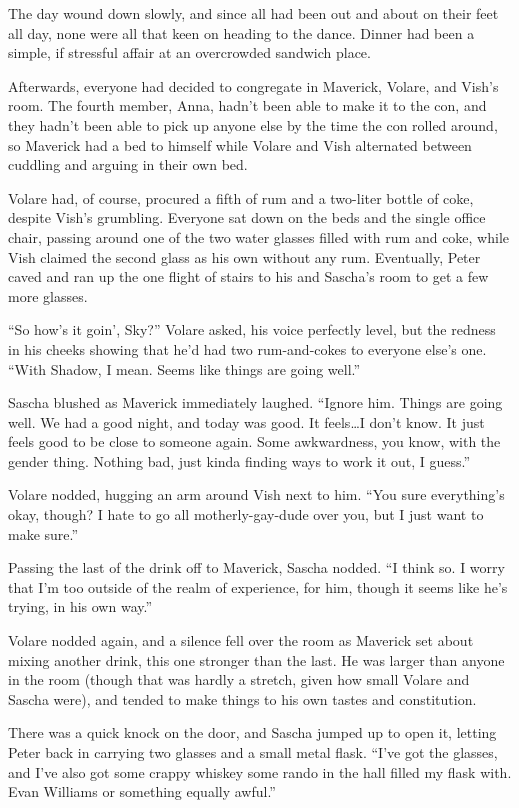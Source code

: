 \secdiv

The day wound down slowly, and since all had been out and about on their feet all day, none were all that keen on heading to the dance. Dinner had been a simple, if stressful affair at an overcrowded sandwich place.

Afterwards, everyone had decided to congregate in Maverick, Volare, and Vish's room. The fourth member, Anna, hadn't been able to make it to the con, and they hadn't been able to pick up anyone else by the time the con rolled around, so Maverick had a bed to himself while Volare and Vish alternated between cuddling and arguing in their own bed.

Volare had, of course, procured a fifth of rum and a two-liter bottle of coke, despite Vish's grumbling. Everyone sat down on the beds and the single office chair, passing around one of the two water glasses filled with rum and coke, while Vish claimed the second glass as his own without any rum. Eventually, Peter caved and ran up the one flight of stairs to his and Sascha's room to get a few more glasses.

``So how's it goin', Sky?'' Volare asked, his voice perfectly level, but the redness in his cheeks showing that he'd had two rum-and-cokes to everyone else's one. ``With Shadow, I mean. Seems like things are going well.''

Sascha blushed as Maverick immediately laughed. ``Ignore him. Things are going well. We had a good night, and today was good. It feels\ldots{}I don't know. It just feels good to be close to someone again. Some awkwardness, you know, with the gender thing. Nothing bad, just kinda finding ways to work it out, I guess.''

Volare nodded, hugging an arm around Vish next to him. ``You sure everything's okay, though? I hate to go all motherly-gay-dude over you, but I just want to make sure.''

Passing the last of the drink off to Maverick, Sascha nodded. ``I think so. I worry that I'm too outside of the realm of experience, for him, though it seems like he's trying, in his own way.''

Volare nodded again, and a silence fell over the room as Maverick set about mixing another drink, this one stronger than the last. He was larger than anyone in the room (though that was hardly a stretch, given how small Volare and Sascha were), and tended to make things to his own tastes and constitution.

There was a quick knock on the door, and Sascha jumped up to open it, letting Peter back in carrying two glasses and a small metal flask. ``I've got the glasses, and I've also got some crappy whiskey some rando in the hall filled my flask with. Evan Williams or something equally awful.''

